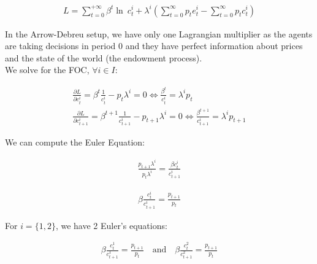 \documentclass{article}
\begin{document}
\begin{gather*}
    L=\sum^{+\infty }_{t=0} \beta^{t} \ln\  c^{i}_{t}+\lambda^i \left( \sum^{\infty}_{t=0}p_{t}e^{i}_{t}-\sum^{\infty}_{t=0}p_{t}c^{i}_{t}\right)  
\end{gather*}

In the Arrow-Debreu setup, we have only one Lagrangian multiplier as the agents are taking decisions in period 0 and they have perfect information about prices and the state of the world (the endowment process).\\


We solve for the FOC, $\forall i \in I$:

\begin{gather*}
\frac{\partial L}{\partial c^{i}_{t}} =\beta^{t} \frac{1}{c^{i}_{t}} -p_{t}\lambda^i =0\Leftrightarrow \frac{\beta^{t} }{c^{i}_{t}} =\lambda^i p_{t} \\
\frac{\partial L}{\partial c^{i}_{t+1}} =\beta^{t+1} \frac{1}{c^{i}_{t+1}} -p_{t+1}\lambda^i =0 \Leftrightarrow \frac{\beta^{t+1} }{c^{i}_{t+1}} =\lambda^i p_{t+1}
\end{gather*}

We can compute the Euler Equation:

\begin{gather*}
\frac{p_{t+1}\lambda^i }{p_{t}\lambda^i } =\frac{\beta c^{i}_{t}}{c^{i}_{t+1}}
\end{gather*}

\begin{gather*}
    \beta \frac{c^{i}_{t}}{c^{i}_{t+1}}=\frac{p_{t+1}}{p_{t}} 
\end{gather*}




For $i=\{1,2\}$, we have 2 Euler's equations:

\begin{gather*}
    \beta \frac{c^{1}_{t}}{c^{1}_{t+1}}=\frac{p_{t+1}}{p_{t}} \quad \mbox{and}\quad \beta \frac{c^{2}_{t}}{c^{2}_{t+1}}=\frac{p_{t+1}}{p_{t}}
\end{gather*}
\end{document}
